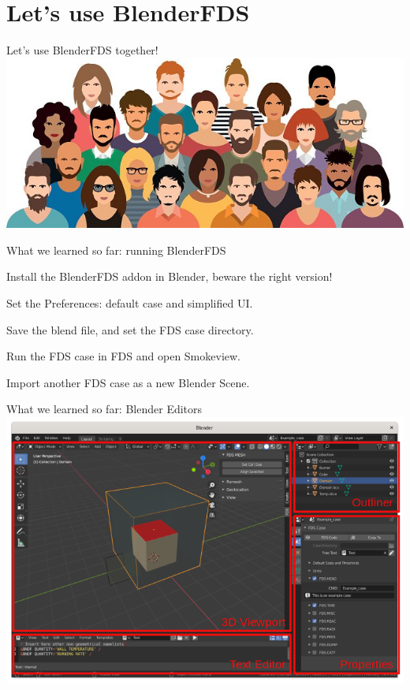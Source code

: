 \documentclass[aspectratio=169]{beamer}
\begin{document}
\section{Let's use BlenderFDS}
\begin{frame}[fragile]{}
  \centering
  \vfill
  {\fontsize{20}{50}\selectfont Let's use BlenderFDS}
  \linebreak
  {\fontsize{40}{50}\selectfont together!}
  \centering
  \vfill
  \includegraphics[width=.65\linewidth]{images/people.jpg}
  \vfill
\end{frame}

\begin{frame}[fragile]{What we learned so far: \linebreak running BlenderFDS}
    \begin{vfilleditems}
        \item Install the BlenderFDS addon in Blender, beware the right version!
        \item Set the Preferences: default case and simplified UI.
        \item Save the blend file, and set the FDS case directory.
        \item Run the FDS case in FDS and open Smokeview.
        \item Import another FDS case as a new Blender Scene.
    \end{vfilleditems}
\end{frame}

\begin{frame}[fragile]{What we learned so far: Blender Editors}
  \centering
  \vfill
  \includegraphics[width=.65\linewidth]{images/bf_editors.png}
  \vfill
\end{frame}
\end{document}
